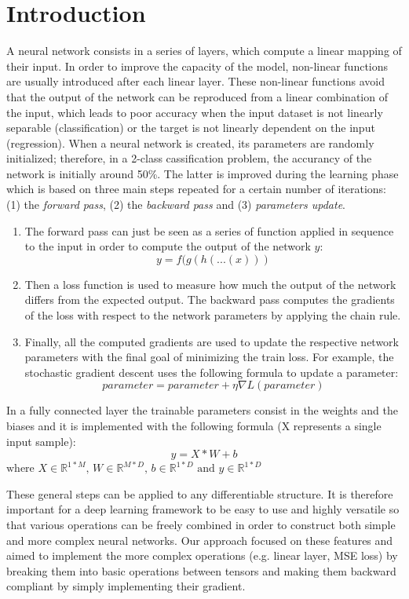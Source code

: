 \documentclass[10pt,conference,compsocconf]{IEEEtran}
\begin{document}
\section{Introduction}
A neural network consists in a series of layers, which compute a linear mapping of their input. In order to improve the capacity of the model, non-linear functions are usually introduced after each linear layer. These non-linear functions avoid that the output of the network can be reproduced from a linear combination of the input, which leads to poor accuracy when the input dataset is not linearly separable (classification) or the target is not linearly dependent on the input (regression).
When a neural network is created, its parameters are randomly initialized; therefore, in a 2-class cassification problem, the accurancy of the network is initially around 50\%. The latter is improved during the learning phase which is based on three main steps repeated for a certain number of iterations: (1) the \textit{forward pass}, (2) the \textit{backward pass} and (3) \textit{parameters update}. 
\begin{enumerate}
    \item The forward pass can just be seen as a series of function applied in sequence to the input in order to compute the output of the network $y$: \[y = f(g(h(...(x)))\]
    \item Then a loss function is used to measure how much the output of the network differs from the expected output. The backward pass computes the gradients of the loss with respect to the network parameters by applying the chain rule.
    \item Finally, all the computed gradients are used to update the respective network parameters with the final goal of minimizing the train loss. For example, the stochastic gradient descent uses the following formula to update a parameter: \[parameter = parameter + \eta\nabla L(parameter)\]
\end{enumerate}
In a fully connected layer the trainable parameters consist in the weights and the biases and it is implemented with the following formula (X represents a single input sample):
\[y = X*W + b\]
 $ \mbox{where } X \in \mathbb{R}^{1*M} 
 \mbox{, } W \in \mathbb{R}^{M*D} 
 \mbox{, } b \in \mathbb{R}^{1*D}
 \mbox{ and } y \in \mathbb{R}^{1*D} $ 

These general steps can be applied to any differentiable structure. It is therefore important for a deep learning framework to be easy to use and highly versatile so that various operations can be freely combined in order to construct both simple and more complex neural networks. Our approach focused on these features and aimed to implement the more complex operations (e.g. linear layer, MSE loss) by breaking them into basic operations between tensors and making them backward compliant by simply implementing their gradient.
\end{document}
